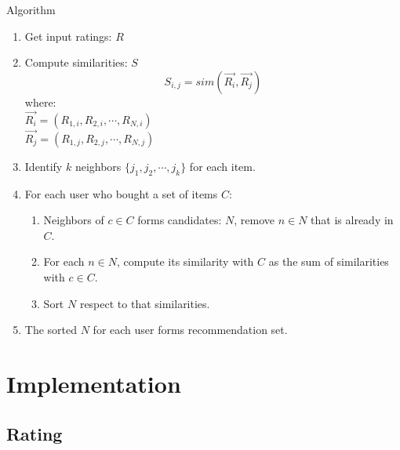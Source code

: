 \documentclass{beamer}
\begin{document}
\begin{frame}[allowframebreaks]{Algorithm}

\begin{enumerate}
\item Get input ratings: $R$
\item Compute similarities: $S$
    \begin{equation}
        S_{i,j} = sim(\vec{R_i},\vec{R_j})
    \end{equation}
    where: \\
    $\vec{R_i} = (R_{1,i},R_{2,i},\cdots,R_{N,i})$\\
    $\vec{R_j} = (R_{1,j},R_{2,j},\cdots,R_{N,j})$
\item Identify $k$ neighbors $\{j_1,j_2,\cdots,j_k\}$ for each item.

\newpage

\item For each user who bought a set of items $C$:
    \begin{enumerate}
    \item Neighbors of $c \in C$ forms candidates: $N$, remove $n \in N$ that is already in $C$.
    \item For each $n \in N$, compute its similarity with $C$ as the sum of similarities with $c \in C$.
    \item Sort $N$ respect to that similarities.
    \end{enumerate}
\item The sorted $N$ for each user forms recommendation set.
\end{enumerate}

\end{frame}

\section{Implementation}

\subsection{Rating}
\end{document}
